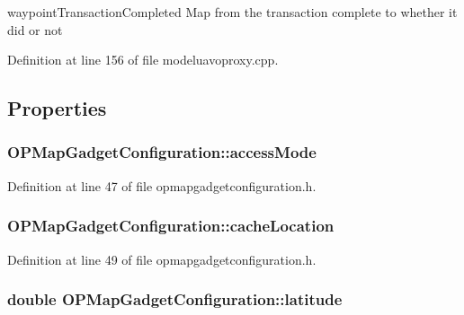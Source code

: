 waypoint\-Transaction\-Completed \-Map from the transaction complete to whether it did or not 

\-Definition at line 156 of file modeluavoproxy.\-cpp.



\subsection{\-Properties}
\hypertarget{group___o_p_map_plugin_ga1b705326683a741d51646ad6c16a0687}{
\subsubsection[{access\-Mode}]{ {\bf \-O\-P\-Map\-Gadget\-Configuration\-::access\-Mode}}}\label{group___o_p_map_plugin_ga1b705326683a741d51646ad6c16a0687}


\-Definition at line 47 of file opmapgadgetconfiguration.\-h.

\hypertarget{group___o_p_map_plugin_ga182bffa488612f55a34e696590887dbf}{
\subsubsection[{cache\-Location}]{ {\bf \-O\-P\-Map\-Gadget\-Configuration\-::cache\-Location}}}\label{group___o_p_map_plugin_ga182bffa488612f55a34e696590887dbf}


\-Definition at line 49 of file opmapgadgetconfiguration.\-h.

\hypertarget{group___o_p_map_plugin_gaadef11a946190d55fa1bc45821414b77}{
\subsubsection[{latitude}]{\setlength{\rightskip}{0pt plus 5cm}double {\bf \-O\-P\-Map\-Gadget\-Configuration\-::latitude}}}\label{group___o_p_map_plugin_gaadef11a946190d55fa1bc45821414b77}


